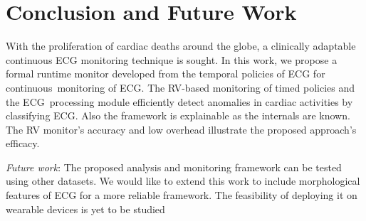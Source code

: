 \section{Conclusion and Future Work}
\label{Conclusion}

With the proliferation of cardiac deaths around the globe, a clinically adaptable continuous ECG monitoring technique is sought.
In this work, we propose a formal runtime monitor developed from the temporal policies of ECG for continuous monitoring of ECG. The RV-based monitoring of timed policies and the ECG processing module efficiently detect anomalies in cardiac activities by classifying ECG. Also the framework is explainable as the internals are known. The RV monitor's accuracy and low overhead illustrate the proposed approach's efficacy.

\textit{Future work}: The proposed analysis and monitoring framework can be tested using other datasets. We would like to extend this work to include morphological features of ECG for a more reliable framework. The feasibility of deploying it on wearable devices is yet to be studied